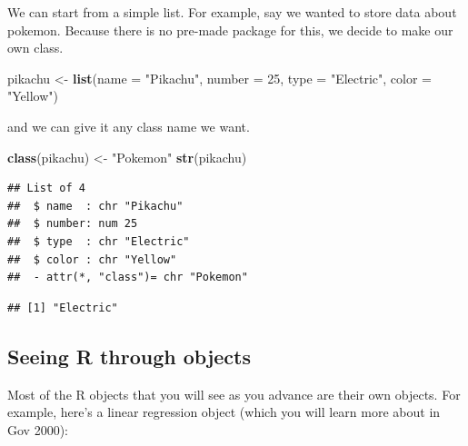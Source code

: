 \documentclass[]{book}
\newenvironment{Shaded}{\begin{snugshade}}{\end{snugshade}}
\newcommand{\DataTypeTok}[1]{\textcolor[rgb]{0.13,0.29,0.53}{#1}}
\newcommand{\DecValTok}[1]{\textcolor[rgb]{0.00,0.00,0.81}{#1}}
\newcommand{\KeywordTok}[1]{\textcolor[rgb]{0.13,0.29,0.53}{\textbf{#1}}}
\newcommand{\NormalTok}[1]{#1}
\newcommand{\OperatorTok}[1]{\textcolor[rgb]{0.81,0.36,0.00}{\textbf{#1}}}
\newcommand{\StringTok}[1]{\textcolor[rgb]{0.31,0.60,0.02}{#1}}
\theoremstyle{definition}
\theoremstyle{definition}
\theoremstyle{definition}
\theoremstyle{remark}
\begin{document}
\begin{Shaded}
\begin{Highlighting}[]
\begin{Shaded}
\begin{Highlighting}[]
\begin{Shaded}
\begin{Highlighting}[]
We can start from a simple list. For example, say we wanted to store data about pokemon. Because there is no pre-made package for this, we decide to make our own class.

\begin{Shaded}
\begin{Highlighting}[]
\NormalTok{pikachu <-}\StringTok{ }\KeywordTok{list}\NormalTok{(}\DataTypeTok{name =} \StringTok{"Pikachu"}\NormalTok{,}
                \DataTypeTok{number =} \DecValTok{25}\NormalTok{,}
                \DataTypeTok{type =} \StringTok{"Electric"}\NormalTok{,}
                \DataTypeTok{color =} \StringTok{"Yellow"}\NormalTok{)}
\end{Highlighting}
\end{Shaded}

and we can give it any class name we want.

\begin{Shaded}
\begin{Highlighting}[]
\KeywordTok{class}\NormalTok{(pikachu) <-}\StringTok{ "Pokemon"}
\KeywordTok{str}\NormalTok{(pikachu)}
\end{Highlighting}
\end{Shaded}

\begin{verbatim}
## List of 4
##  $ name  : chr "Pikachu"
##  $ number: num 25
##  $ type  : chr "Electric"
##  $ color : chr "Yellow"
##  - attr(*, "class")= chr "Pokemon"
\end{verbatim}

\begin{Shaded}
\end{Shaded}

\begin{verbatim}
## [1] "Electric"
\end{verbatim}

\hypertarget{seeing-r-through-objects}{%
\subsection{Seeing R through objects}\label{seeing-r-through-objects}}

Most of the R objects that you will see as you advance are their own objects. For example, here's a linear regression object (which you will learn more about in Gov 2000):


\end{Highlighting}
\end{Shaded}
\end{Highlighting}
\end{Shaded}
\end{Highlighting}
\end{Shaded}
\end{document}
